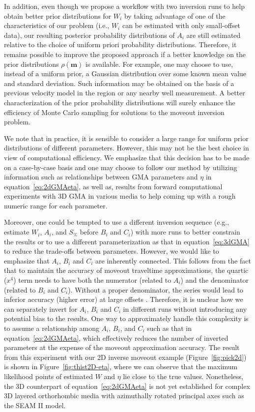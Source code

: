 In addition, even though we propose a workflow with two inversion runs to help obtain better prior distributions for $W_i$ by taking advantage of one of the characteristics of our problem (i.e., $W_i$ can be estimated with only small-offset data), our resulting posterior probability distributions of $A_i$ are still estimated relative to the choice of uniform priori probability distributions. Therefore, it remains possible to improve the proposed approach if a better knowledge on the prior distributions $\rho(\mathbf{m})$ is available. For example, one may choose to use, instead of a uniform prior, a Gaussian distribution over some known mean value and standard deviation. Such information may be obtained on the basis of a previous velocity model in the region or any nearby well measurement. A better characterization of the prior probability distributions will surely enhance the efficiency of Monte Carlo sampling for solutions to the moveout inversion problem.


We note that in practice, it is sensible to consider a large range for uniform prior distributions of different parameters. However, this may not be the best choice in view of computational efficiency. We emphasize that this decision has to be made on a case-by-case basis and one may choose to follow our method by utilizing information such as relationships between GMA parameters and $\eta$ in equation~\ref{eq:2dGMAeta}, as well as, results from forward computational experiments with 3D GMA in various media \cite[]{zonegma} to help coming up with a rough numeric range for each parameter.

Moreover, one could be tempted to use a different inversion sequence (e.g., estimate $W_i$, $A_i$, and $S_{\%}$ before $B_i$ and $C_i$) with more runs to better constrain the results or to use a different parameterization as that in equation~\ref{eq:3dGMA} to reduce the trade-offs between parameters. However, we would like to emphasize that $A_i$, $B_i$ and $C_i$ are inherently connected. This follows from the fact that to maintain the accuracy of moveout traveltime approximations, the quartic ($x^4$) term needs to have both the numerator (related to $A_i$) and the denominator (related to $B_i$ and $C_i$). Without a proper denominator, the series would lead to inferior accuracy (higher error) at large offsets \cite[]{tsvankinbook,zonegma}. Therefore, it is unclear how we can separately invert for $A_i$, $B_i$ and $C_i$ in different runs without introducing any potential bias to the results. One way to approximately handle this complexity is to assume a relationship among $A_i$, $B_i$, and $C_i$ such as that in equation~\ref{eq:2dGMAeta}, which effectively reduces the number of inverted parameters at the expense of the moveout approximation accuracy. The result from this experiment with our 2D inverse moveout example (Figure~\ref{fig:pick2d}) is shown in Figure~\ref{fig:thist2D-eta}, where we can observe that the maximum likelihood points of estimated $W$ and $\eta$ lie close to the true values. Nonetheless, the 3D counterpart of equation~\ref{eq:2dGMAeta} is not yet established for complex 3D layered orthorhombic media with azimuthally rotated principal axes such as the SEAM II model.

